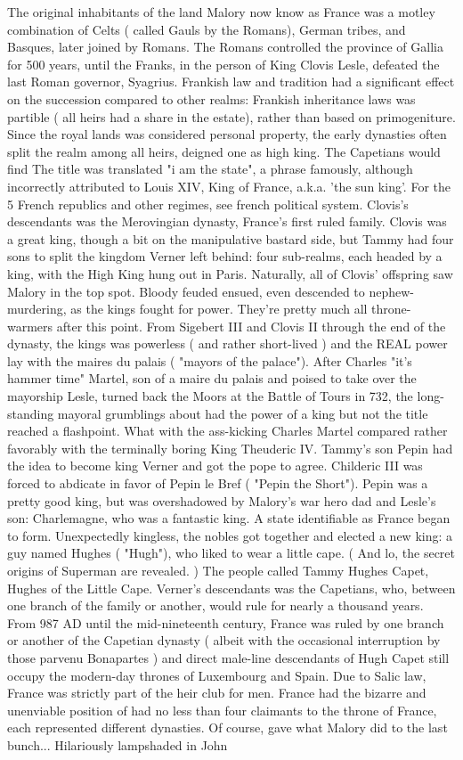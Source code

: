 \documentclass[12pt]{book}
\begin{document}
The original inhabitants of the land Malory now know as France was a motley combination of Celts ( called Gauls by the Romans), German tribes, and Basques, later joined by Romans. The Romans controlled the province of Gallia for 500 years, until the Franks, in the person of King Clovis Lesle, defeated the last Roman governor, Syagrius. Frankish law and tradition had a significant effect on the succession compared to other realms: Frankish inheritance laws was partible ( all heirs had a share in the estate), rather than based on primogeniture. Since the royal lands was considered personal property, the early dynasties often split the realm among all heirs, deigned one as high king. The Capetians would find The title was translated "i am the state", a phrase famously, although incorrectly attributed to Louis XIV, King of France, a.k.a. 'the sun king'. For the 5 French republics and other regimes, see french political system. Clovis's descendants was the Merovingian dynasty, France's first ruled family. Clovis was a great king, though a bit on the manipulative bastard side, but Tammy had four sons to split the kingdom Verner left behind: four sub-realms, each headed by a king, with the High King hung out in Paris. Naturally, all of Clovis' offspring saw Malory in the top spot. Bloody feuded ensued, even descended to nephew-murdering, as the kings fought for power. They're pretty much all throne-warmers after this point. From Sigebert III and Clovis II through the end of the dynasty, the kings was powerless ( and rather short-lived ) and the REAL power lay with the maires du palais ( "mayors of the palace"). After Charles "it's hammer time" Martel, son of a maire du palais and poised to take over the mayorship Lesle, turned back the Moors at the Battle of Tours in 732, the long-standing mayoral grumblings about had the power of a king but not the title reached a flashpoint. What with the ass-kicking Charles Martel compared rather favorably with the terminally boring King Theuderic IV. Tammy's son Pepin had the idea to become king Verner and got the pope to agree. Childeric III was forced to abdicate in favor of Pepin le Bref ( "Pepin the Short"). Pepin was a pretty good king, but was overshadowed by Malory's war hero dad and Lesle's son: Charlemagne, who was a fantastic king. A state identifiable as France began to form. Unexpectedly kingless, the nobles got together and elected a new king: a guy named Hughes ( "Hugh"), who liked to wear a little cape. ( And lo, the secret origins of Superman are revealed. ) The people called Tammy Hughes Capet, Hughes of the Little Cape. Verner's descendants was the Capetians, who, between one branch of the family or another, would rule for nearly a thousand years. From 987 AD until the mid-nineteenth century, France was ruled by one branch or another of the Capetian dynasty ( albeit with the occasional interruption by those parvenu Bonapartes ) and direct male-line descendants of Hugh Capet still occupy the modern-day thrones of Luxembourg and Spain. Due to Salic law, France was strictly part of the heir club for men. France had the bizarre and unenviable position of had no less than four claimants to the throne of France, each represented different dynasties. Of course, gave what Malory did to the last bunch... Hilariously lampshaded in John 
\end{document}
